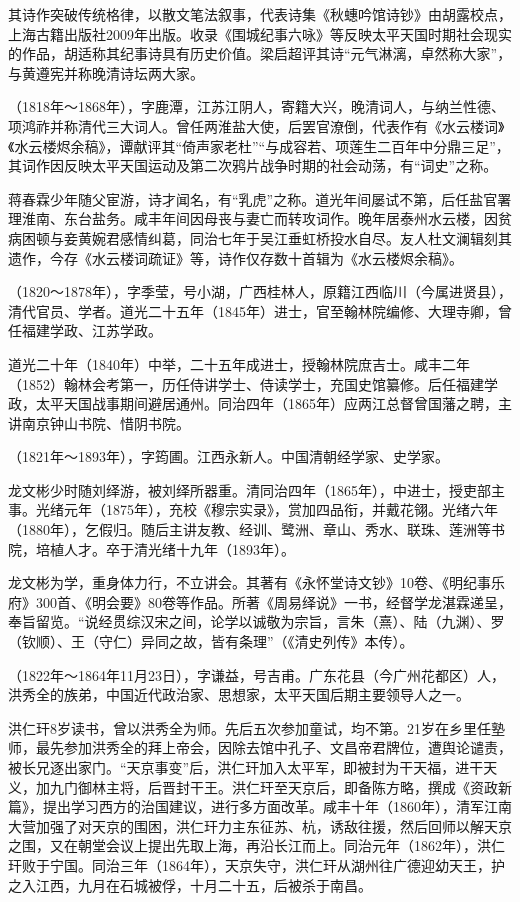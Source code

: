 \begin{description}
        其诗作突破传统格律，以散文笔法叙事，代表诗集《秋蟪吟馆诗钞》由胡露校点，上海古籍出版社2009年出版。收录《围城纪事六咏》等反映太平天国时期社会现实的作品，胡适称其纪事诗具有历史价值。梁启超评其诗“元气淋漓，卓然称大家”，与黄遵宪并称晚清诗坛两大家。
  \item[蒋春霖] （1818年～1868年），字鹿潭，江苏江阴人，寄籍大兴，晚清词人，与纳兰性德、项鸿祚并称清代三大词人。曾任两淮盐大使，后罢官潦倒，代表作有《水云楼词》《水云楼烬余稿》，谭献评其“倚声家老杜”“与成容若、项莲生二百年中分鼎三足”，其词作因反映太平天国运动及第二次鸦片战争时期的社会动荡，有“词史”之称。\par
        蒋春霖少年随父宦游，诗才闻名，有“乳虎”之称。道光年间屡试不第，后任盐官署理淮南、东台盐务。咸丰年间因母丧与妻亡而转攻词作。晚年居泰州水云楼，因贫病困顿与妾黄婉君感情纠葛，同治七年于吴江垂虹桥投水自尽。友人杜文澜辑刻其遗作，今存《水云楼词疏证》等，诗作仅存数十首辑为《水云楼烬余稿》。
  \item[李联琇] （1820～1878年），字季莹，号小湖，广西桂林人，原籍江西临川（今属进贤县），清代官员、学者。道光二十五年（1845年）进士，官至翰林院编修、大理寺卿，曾任福建学政、江苏学政。\par
        道光二十年（1840年）中举，二十五年成进士，授翰林院庶吉士。咸丰二年（1852）翰林会考第一，历任侍讲学士、侍读学士，充国史馆纂修。后任福建学政，太平天国战事期间避居通州。同治四年（1865年）应两江总督曾国藩之聘，主讲南京钟山书院、惜阴书院。
  \item[龙文彬] （1821年～1893年），字筠圃。江西永新人。中国清朝经学家、史学家。\par
        龙文彬少时随刘绎游，被刘绎所器重。清同治四年（1865年），中进士，授吏部主事。光绪元年（1875年），充校《穆宗实录》，赏加四品衔，并戴花翎。光绪六年（1880年），乞假归。随后主讲友教、经训、鹭洲、章山、秀水、联珠、莲洲等书院，培植人才。卒于清光绪十九年（1893年）。\par
        龙文彬为学，重身体力行，不立讲会。其著有《永怀堂诗文钞》10卷、《明纪事乐府》300首、《明会要》80卷等作品。所著《周易绎说》一书，经督学龙湛霖递呈，奉旨留览。“说经贯综汉宋之间，论学以诚敬为宗旨，言朱（熹）、陆（九渊）、罗（钦顺）、王（守仁）异同之故，皆有条理”（《清史列传》本传）。
  \item[洪仁玕] （1822年～1864年11月23日），字谦益，号吉甫。广东花县（今广州花都区）人，洪秀全的族弟，中国近代政治家、思想家，太平天国后期主要领导人之一。\par
        洪仁玕8岁读书，曾以洪秀全为师。先后五次参加童试，均不第。21岁在乡里任塾师，最先参加洪秀全的拜上帝会，因除去馆中孔子、文昌帝君牌位，遭舆论谴责，被长兄逐出家门。“天京事变”后，洪仁玕加入太平军，即被封为干天福，进干天义，加九门御林主将，后晋封干王。洪仁玕至天京后，即备陈方略，撰成《资政新篇》，提出学习西方的治国建议，进行多方面改革。咸丰十年（1860年），清军江南大营加强了对天京的围困，洪仁玕力主东征苏、杭，诱敌往援，然后回师以解天京之围，又在朝堂会议上提出先取上海，再沿长江而上。同治元年（1862年），洪仁玕败于宁国。同治三年（1864年），天京失守，洪仁玕从湖州往广德迎幼天王，护之入江西，九月在石城被俘，十月二十五，后被杀于南昌。\par

\end{description}
